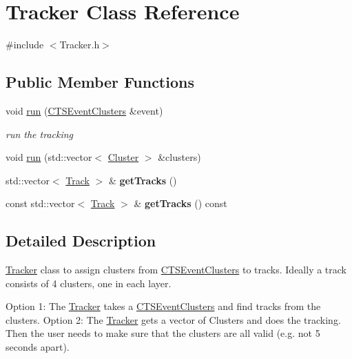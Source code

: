 \hypertarget{classTracker}{}\section{Tracker Class Reference}
\label{classTracker}


{\ttfamily \#include $<$Tracker.\+h$>$}

\subsection*{Public Member Functions}
\begin{DoxyCompactItemize}
\item 
\mbox{\label{classTracker_a0d1dbe040244059c6f2d3f6faafc15de}} 
void \hyperlink{classTracker_a0d1dbe040244059c6f2d3f6faafc15de}{run} (\hyperlink{classCTSEventClusters}{C\+T\+S\+Event\+Clusters} \&event)
\begin{DoxyCompactList}\small\item\em run the tracking \end{DoxyCompactList}\item 
void \hyperlink{classTracker_aebeb8b9c0504f9ab36956a3c6dd686c2}{run} (std\+::vector$<$ \hyperlink{classCluster}{Cluster} $>$ \&clusters)
\item 
\mbox{\label{classTracker_aef4dc4623f6c4cc9625fc41d9e6c7265}} 
std\+::vector$<$ \hyperlink{classTrack}{Track} $>$ \& {\bfseries get\+Tracks} ()
\item 
\mbox{\label{classTracker_a44e36501176a9bc19570de51732b1d44}} 
const std\+::vector$<$ \hyperlink{classTrack}{Track} $>$ \& {\bfseries get\+Tracks} () const
\end{DoxyCompactItemize}


\subsection{Detailed Description}
\hyperlink{classTracker}{Tracker} class to assign clusters from \hyperlink{classCTSEventClusters}{C\+T\+S\+Event\+Clusters} to tracks. Ideally a track consists of 4 clusters, one in each layer.

Option 1\+: The \hyperlink{classTracker}{Tracker} takes a \hyperlink{classCTSEventClusters}{C\+T\+S\+Event\+Clusters} and find tracks from the clusters. Option 2\+: The \hyperlink{classTracker}{Tracker} gets a vector of Clusters and does the tracking. Then the user needs to make sure that the clusters are all valid (e.\+g. not 5 seconds apart).

